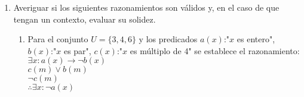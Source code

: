\documentclass[a4paper]{article}
\newcommand{\exercise}{\item}
\newcommand{\then}{\to}
\begin{document}
\begin{enumerate}
\begin{enumerate} [label=(\alph*)]
			$U = { (1,1), (1,2), (1,2), (2,1), (2,2), (2,3), (3,1), (3,2), (3,3) }$ \\
			Hallar el valor de verdad de: \\
			$\exists x \exists y ( x+y = 2 )$  \\ 
			$\forall x \exists y ( x+y = 2 )$  \\ 
			$\forall x \exists y ( x+y = 4 )$  \\ 
			$\exists x \forall y ( x-y \geq  0 )$  \\ 
			$\forall x \forall y ( x+y \geq  4 )$
		\item $x,y \in  \mathbb{R} $ \\
			$U = \mathbb{R} 2$ \\
			Hallar el valor de verdad de: \\
			$\forall x \exists y ( x+y = 1 ) $   	\\
			$\forall x \exists y ( x-y \geq  0  \lor   x-y \geq  -5 ) $   	\\   	
			$\exists x \forall y ( x > y  \land   x2 < y  )    $    \\
			$\forall x \forall y ( x-y \leq  0  \then   x < y+2  ) $
		\item $x,y,z \in  \mathbb{R}  $ \\
			$U = \mathbb{R} 3 $ \\
			Hallar el valor de verdad de: \\
			$\forall x \forall y \exists z ( x < y  \then   x < z < y ) $ \\
			$\exists x \exists y \exists z ( x=y \land  y=z \then  x\neq  z ) $ 
		\item $\forall x \in U: x^2 < 26$, con $U=\{1,3,5\}$
		\item $\exists x \in U: x^2 < 26$, con $U=\{1,3,5\}$
		\item $\exists x \in U: x^2 < 26$, con $U=\{7,8\}$
		\item $\forall x \in \mathbb{N}: x^2 -9 =0$
		\item $\exists x \in \mathbb{N}: x^2 -9 =0$
		\item $\forall x \in \mathbb{R}: x+3 < 6$
		\item $\exists x \in \mathbb{R}: x+3 < 6$
	\end{enumerate}
	\exercise Averiguar si los siguientes razonamientos son válidos y, en el caso de que tengan un contexto, evaluar su solidez.
	\begin{enumerate} [label=(\alph*)]
		\item Para el conjunto $U=\{ 3, 4, 6\}$ y los predicados $a(x)$:"$x$ es entero", $b(x)$:"$x$ es par", $c(x)$:"$x$ es múltiplo de 4" se establece el razonamiento: \\ $\exists x: a(x) \then \neg b(x)$ \\ $c(m) \lor b(m)$ \\ $\neg c(m)$ \\ $\therefore \exists x: \neg a(x)$ 

\end{enumerate}
\end{enumerate}
\end{document}
